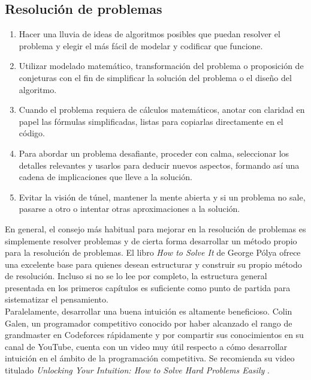 \subsection{Resolución de problemas}
\begin{enumerate}[resume=icpc]
    \item Hacer una lluvia de ideas de algoritmos posibles que puedan resolver el problema y elegir el más fácil de modelar y codificar que funcione.
    \item Utilizar modelado matemático, transformación del problema o proposición de conjeturas con el fin de simplificar la solución del problema o el diseño del algoritmo. 
    \item Cuando el problema requiera de cálculos matemáticos, anotar con claridad en papel las fórmulas simplificadas, listas para copiarlas directamente en el código.
    \item Para abordar un problema desafiante, proceder con calma, seleccionar los detalles relevantes y usarlos para deducir nuevos aspectos, formando así una cadena de implicaciones que lleve a la solución.
    \item Evitar la visión de túnel, mantener la mente abierta y si un problema no sale, pasarse a otro o intentar otras aproximaciones a la solución.
\end{enumerate}
En general, el consejo más habitual para mejorar en la resolución de problemas es simplemente resolver problemas y de cierta forma desarrollar un método propio para la resolución de problemas. El libro \textit{How to Solve It} de George Pólya \cite{polya1957} ofrece una excelente base para quienes desean estructurar y construir su propio método de resolución. Incluso si no se lo lee por completo, la estructura general presentada en los primeros capítulos es suficiente como punto de partida para sistematizar el pensamiento. \\

Paralelamente, desarrollar una buena intuición es altamente beneficioso. Colin Galen, un programador competitivo conocido por haber alcanzado el rango de grandmaster en Codeforces rápidamente y por compartir sus conocimientos en su canal de YouTube, cuenta con un video muy útil respecto a cómo desarrollar intuición en el ámbito de la programación competitiva. Se recomienda su video titulado \textit{Unlocking Your Intuition: How to Solve Hard Problems Easily} \cite{colingalen2022}.
\pagebreak
